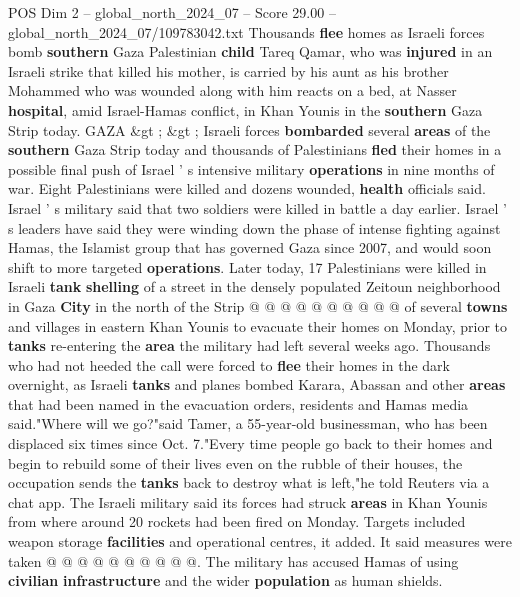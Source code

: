 \begin{textsample}{POS Dim 2 – global\_north\_2024\_07 – Score 29.00 – global\_north\_2024\_07/109783042.txt}  \label{ex:f2_pos_386}
Thousands \textbf{flee} homes as Israeli forces bomb \textbf{southern} Gaza Palestinian \textbf{child} Tareq Qamar, who was \textbf{injured} in an Israeli strike that killed his mother, is carried by his aunt as his brother Mohammed who was wounded along with him reacts on a bed, at Nasser \textbf{hospital}, amid Israel-Hamas conflict, in Khan Younis in the \textbf{southern} Gaza Strip today.
GAZA \&gt ; \&gt ; Israeli forces \textbf{bombarded} several \textbf{areas} of the \textbf{southern} Gaza Strip today and thousands of Palestinians \textbf{fled} their homes in a possible final push of Israel ' s intensive military \textbf{operations} in nine months of war.
Eight Palestinians were killed and dozens wounded, \textbf{health} officials said.
Israel ' s military said that two soldiers were killed in battle a day earlier.
Israel ' s leaders have said they were winding down the phase of intense fighting against Hamas, the Islamist group that has governed Gaza since 2007, and would soon shift to more targeted \textbf{operations}.
Later today, 17 Palestinians were killed in Israeli \textbf{tank} \textbf{shelling} of a street in the densely populated Zeitoun neighborhood in Gaza \textbf{City} in the north of the Strip @ @ @ @ @ @ @ @ @ @ of several \textbf{towns} and villages in eastern Khan Younis to evacuate their homes on Monday, prior to \textbf{tanks} re-entering the \textbf{area} the military had left several weeks ago.
Thousands who had not heeded the call were forced to \textbf{flee} their homes in the dark overnight, as Israeli \textbf{tanks} and planes bombed Karara, Abassan and other \textbf{areas} that had been named in the evacuation orders, residents and Hamas media said."Where will we go?"said Tamer, a 55-year-old businessman, who has been displaced six times since Oct. 7."Every time people go back to their homes and begin to rebuild some of their lives even on the rubble of their houses, the occupation sends the \textbf{tanks} back to destroy what is left,"he told Reuters via a chat app.
The Israeli military said its forces had struck \textbf{areas} in Khan Younis from where around 20 rockets had been fired on Monday.
Targets included weapon storage \textbf{facilities} and operational centres, it added.
It said measures were taken @ @ @ @ @ @ @ @ @ @.
The military has accused Hamas of using \textbf{civilian} \textbf{infrastructure} and the wider \textbf{population} as human shields.

\end{textsample}
